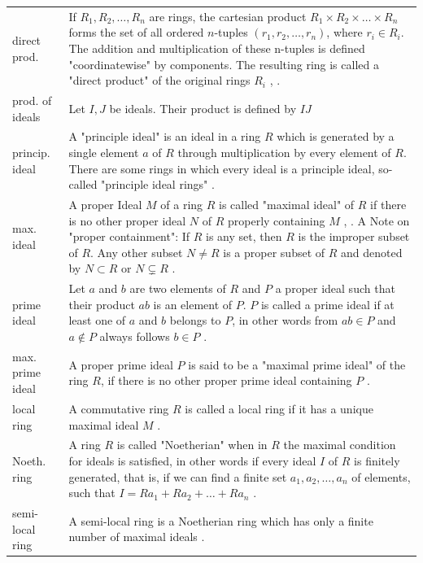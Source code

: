 \documentclass[12pt]{amsart}
\theoremstyle{definition}
\begin{document}
{\renewcommand{\arraystretch}{1.8}
\begin{table}[H]
	\centering
	\begin{tabular}{|P{1.4cm} p{13.4cm}|}
		\hline
		direct prod. & If $R_1,R_2,\ldots,R_n$ are rings, the cartesian product $R_1\times R_2\times\ldots\times R_n$ forms the set of all ordered $n$-tuples $(r_1,r_2,\ldots,r_n)$, where $r_i\in R_i$. The addition and multiplication of these n-tuples is defined "coordinatewise" by components. The resulting ring is called a "direct product" of the original rings $R_i$ \cite[p.~51]{Ref_Wolfart_2011}, \cite[p.~169]{Ref_Fraleigh_2014}.
		\\
		prod. of ideals & Let $I,J$ be ideals. Their product is defined by $IJ$
		\\
		princip. ideal & A "principle ideal" is an ideal in a ring $R$ which is generated by a single element $a$ of $R$ through multiplication by every element of $R$. There are some rings in which every ideal is a principle ideal, so-called "principle ideal rings" \cite[p.~68]{Ref_Wolfart_2011}.
		\\
		max. ideal & A proper Ideal $M$ of a ring $R$ is called "maximal ideal" of $R$  if there is no other proper ideal $N$ of $R$ properly containing $M$ \cite[p.~247]{Ref_Fraleigh_2014}, \cite[p.~37]{Ref_Northcott_1953}. A Note on "proper containment": If $R$ is any set, then $R$ is the improper subset of $R$. Any other subset $N\ne R$ is a proper subset of $R$ and denoted by $N\subset R$ or $N\varsubsetneq R$ \cite[p.~2]{Ref_Fraleigh_2014}.
		\\
		prime ideal & Let $a$ and $b$ are two elements of $R$ and $P$ a proper ideal such that their product $ab$ is an element of $P$. $P$ is called a prime ideal if at least one of $a$ and $b$ belongs to $P$, in other words from $ab\in P$ and $a\notin P$ always follows $b\in P$ \cite[p.~9]{Ref_Northcott_1953}.
		\\
		max. prime ideal & A proper prime ideal $P$ is said to be a "maximal prime ideal" of the ring $R$, if there is no other proper prime ideal containing $P$ \cite[p.~23]{Ref_Northcott_1953}.
		\\
		local ring & A commutative ring $R$ is called a local ring if it has a unique maximal ideal $M$ \cite[p.~522]{Ref_Rotman_2005}.
		\\
		Noeth. ring & A ring $R$ is called "Noetherian" when in $R$ the maximal condition for ideals is satisfied, in other words if every ideal $I$ of $R$ is finitely generated, that is, if we can find a finite set $a_1,a_2,\ldots,a_n$ of elements, such that $I=Ra_1+Ra_2+\ldots+Ra_n$ \cite[p.~19, 101]{Ref_Northcott_1953}.
		\\
		semi-local ring & A semi-local ring is a Noetherian ring which has only a finite number of maximal ideals \cite[p.~107]{Ref_Northcott_1953}.
		\\ \hline
	\end{tabular}
\end{table}}
\end{document}
